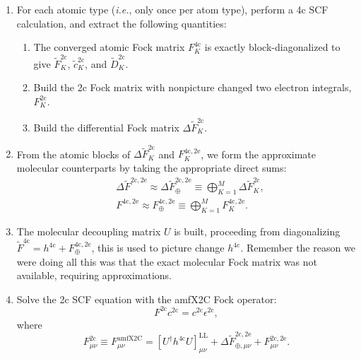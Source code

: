 \documentclass{article}
\begin{document}
\begin{enumerate}
    \item For each atomic type (\textit{i.e.}, only once per atom type), perform a 4c SCF calculation, and extract the following quantities:
    \begin{enumerate}
    \item The converged atomic Fock matrix $F^{\mathrm{4c}}_K$ is exactly block-diagonalized to give $\tilde{F}^{\mathrm{2c}}_K$, $\tilde{c}^{\mathrm{2c}}_K$, and $\tilde{D}^{\mathrm{2c}}_K$.
    \item Build the 2c Fock matrix with nonpicture changed two electron integrals, $F^{\mathrm{2c}}_{K}$.
    \item Build the differential Fock matrix $\Delta\tilde{F}^{\mathrm{2c}}_K$.
    \end{enumerate}
    \item From the atomic blocks of $\Delta\tilde{F}^{\mathrm{2c}}_K$ and $F^{\mathrm{4c,2e}}_K$, we form the approximate molecular counterparts by taking the appropriate direct sums:
    \begin{align}
    &\Delta\tilde{F}^{\mathrm{2c,2e}}\approx\Delta\tilde{F}_{\oplus}^{\mathrm{2c,2e}}\equiv\bigoplus_{K=1}^M\Delta\tilde{F}^{\mathrm{2c}}_K,\\
    &{F}^{\mathrm{4c,2e}}\approx{F}_{\oplus}^{\mathrm{4c,2e}}\equiv\bigoplus_{K=1}^M{F}^{\mathrm{4c,2e}}_K.
    \end{align}
    \item The molecular decoupling matrix $U$ is built, proceeding from diagonalizing $\tilde{F}^{\mathrm{4c}}=h^{\mathrm{4c}}+F_{\oplus}^{\mathrm{4c,2e}}$, this is used to picture change $h^{\mathrm{4c}}$. Remember the reason we were doing all this was that the exact molecular Fock matrix was not available, requiring approximations.
    \item Solve the 2c SCF equation with the amfX2C Fock operator:
    \begin{equation}
    F^{\mathrm{2c}}c^{\mathrm{2c}}=c^{\mathrm{2c}}\epsilon^{\mathrm{2c}},
    \end{equation}
    where
    \begin{equation}
    F^{\mathrm{2c}}_{\mu\nu}\equiv F^{\mathrm{amfX2C}}_{\mu\nu}=[U^{\dagger}h^{\mathrm{4c}}U]^{\mathrm{LL}}_{\mu\nu}+\Delta\tilde{F}^{\mathrm{2c,2e}}_{\oplus,\mu\nu}+F^{\mathrm{2c,2e}}_{\mu\nu}.
    \end{equation}
\end{enumerate}



\end{document}
